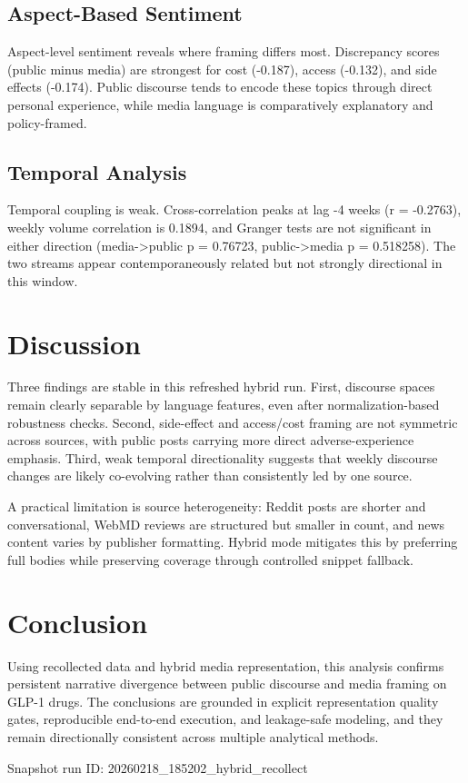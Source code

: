 \documentclass[10pt,letterpaper,twocolumn]{article}
\begin{document}
\subsection{Aspect-Based Sentiment}
Aspect-level sentiment reveals where framing differs most. Discrepancy scores (public minus media) are strongest for cost (-0.187), access (-0.132), and side effects (-0.174). Public discourse tends to encode these topics through direct personal experience, while media language is comparatively explanatory and policy-framed.

\subsection{Temporal Analysis}
Temporal coupling is weak. Cross-correlation peaks at lag -4 weeks (r = -0.2763), weekly volume correlation is 0.1894, and Granger tests are not significant in either direction (media->public p = 0.76723, public->media p = 0.518258). The two streams appear contemporaneously related but not strongly directional in this window.

\section{Discussion}
Three findings are stable in this refreshed hybrid run. First, discourse spaces remain clearly separable by language features, even after normalization-based robustness checks. Second, side-effect and access/cost framing are not symmetric across sources, with public posts carrying more direct adverse-experience emphasis. Third, weak temporal directionality suggests that weekly discourse changes are likely co-evolving rather than consistently led by one source.

A practical limitation is source heterogeneity: Reddit posts are shorter and conversational, WebMD reviews are structured but smaller in count, and news content varies by publisher formatting. Hybrid mode mitigates this by preferring full bodies while preserving coverage through controlled snippet fallback.

\newpage
\section{Conclusion}
Using recollected data and hybrid media representation, this analysis confirms persistent narrative divergence between public discourse and media framing on GLP-1 drugs. The conclusions are grounded in explicit representation quality gates, reproducible end-to-end execution, and leakage-safe modeling, and they remain directionally consistent across multiple analytical methods.

\vfill
\begin{center}
\small Snapshot run ID: 20260218\_185202\_hybrid\_recollect
\end{center}
\end{document}
